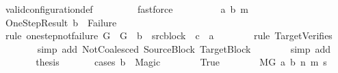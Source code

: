 \begin{isabellebody}
\ valid{\isacharunderscore}{\kern0pt}configuration{\isacharunderscore}{\kern0pt}def\ \isanewline
\ \ \ \ \ \ \isamarkupfalse%
\ fastforce\isanewline
\ \ \isamarkupfalse%
\isanewline
\ \ \ \ \isamarkupfalse%
\ {\isacharparenleft}{\kern0pt}{}\ a\ b\ m{\isacharparenright}{\kern0pt}\isanewline
\ \ \ \ \isamarkupfalse%
\ OneStepResult{\isacharcolon}{\kern0pt}\ {\isachardoublequoteopen}b\ {\isasymnoteq}\ Failure{\isachardoublequoteclose}\isanewline
\ \ \ \ \ \ \isamarkupfalse%
\ {\isacharparenleft}{\kern0pt}rule\ one{\isacharunderscore}{\kern0pt}step{\isacharunderscore}{\kern0pt}not{\isacharunderscore}{\kern0pt}failure{\isacharbrackleft}{\kern0pt}\ {\isacharquery}{\kern0pt}G\ {\isacharequal}{\kern0pt}\ G\ \ {\isacharquery}{\kern0pt}b\ {\isacharequal}{\kern0pt}\ src{\isacharunderscore}{\kern0pt}block\ \ {\isacharquery}{\kern0pt}c\ {\isacharequal}{\kern0pt}\ a{\isacharbrackright}{\kern0pt}{\isacharparenright}{\kern0pt}\isanewline
\ \ \ \ \ \ \isamarkupfalse%
\ {\isacharparenleft}{\kern0pt}rule\ TargetVerifies{\isacharparenright}{\kern0pt}\isanewline
\ \ \ \ \ \ \isamarkupfalse%
\ {\isacharparenleft}{\kern0pt}simp\ add{\isacharcolon}{\kern0pt}\ NotCoalesced\ SourceBlock\ TargetBlock{\isacharparenright}{\kern0pt}\isanewline
\ \ \ \ \ \ \isamarkupfalse%
\ {\isacharparenleft}{\kern0pt}simp\ add{\isacharcolon}{\kern0pt}\ {\isachardoublequoteopen}{}{\isachardoublequoteclose}{\isacharparenleft}{\kern0pt}{}{\isacharparenright}{\kern0pt}{\isacharparenright}{\kern0pt}\isanewline
\ \ \ \ \isamarkupfalse%
\ \isamarkupfalse%
\ {\isacharquery}{\kern0pt}thesis\ \isanewline
\ \ \ \ \isamarkupfalse%
\ {\isacharparenleft}{\kern0pt}cases\ {\isachardoublequoteopen}b\ {\isacharequal}{\kern0pt}\ Magic{\isachardoublequoteclose}{\isacharparenright}{\kern0pt}\isanewline
\ \ \ \ \ \ \isamarkupfalse%
\ True\isanewline
\ \ \ \ \ \ \isamarkupfalse%
\ {\isachardoublequoteopen}M{\isacharcomma}{\kern0pt}{\isasymLambda}{\isacharcomma}{\kern0pt}{\isasymGamma}{\isacharcomma}{\kern0pt}{\isasymOmega}{\isacharcomma}{\kern0pt}G\ {\isasymturnstile}{\isacharparenleft}{\kern0pt}a{\isacharcomma}{\kern0pt}\ b{\isacharparenright}{\kern0pt}\ {\isacharminus}{\kern0pt}n{\isasymrightarrow}{\isacharasterisk}{\kern0pt}\ {\isacharparenleft}{\kern0pt}m{\isacharprime}{\kern0pt}{\isacharcomma}{\kern0pt}\ s{\isacharprime}{\kern0pt}{\isacharparenright}{\kern0pt}{\isachardoublequoteclose}\isanewline

\end{isabellebody}
